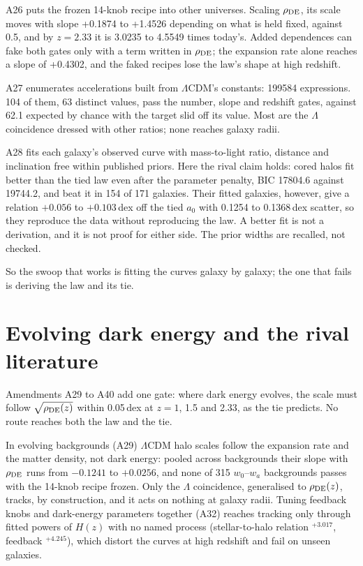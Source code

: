 \documentclass[11pt]{article}
\begin{document}
A26 puts the frozen 14-knob recipe into other universes. Scaling $\rho_{\rm DE}$, its scale moves with slope +0.1874 to +1.4526 depending on what is held fixed, against 0.5, and by $z=2.33$ it is 3.0235 to 4.5549 times today's. Added dependences can fake both gates only with a term written in $\rho_{\rm DE}$; the expansion rate alone reaches a slope of +0.4302, and the faked recipes lose the law's shape at high redshift.

A27 enumerates accelerations built from $\Lambda$CDM's constants: 199584 expressions. 104 of them, 63 distinct values, pass the number, slope and redshift gates, against 62.1 expected by chance with the target slid off its value. Most are the $\Lambda$ coincidence dressed with other ratios; none reaches galaxy radii.

A28 fits each galaxy's observed curve with mass-to-light ratio, distance and inclination free within published priors. Here the rival claim holds: cored halos fit better than the tied law even after the parameter penalty, BIC 17804.6 against 19744.2, and beat it in 154 of 171 galaxies. Their fitted galaxies, however, give a relation $+0.056$ to $+0.103$\,dex off the tied $a_0$ with 0.1254 to 0.1368\,dex scatter, so they reproduce the data without reproducing the law. A better fit is not a derivation, and it is not proof for either side. The prior widths are recalled, not checked.

So the swoop that works is fitting the curves galaxy by galaxy; the one that fails is deriving the law and its tie.

\section{Evolving dark energy and the rival literature}
Amendments A29 to A40 add one gate: where dark energy evolves, the scale must follow $\sqrt{\rho_{\rm DE}(z)}$ within 0.05\,dex at $z=1$, 1.5 and 2.33, as the tie predicts. No route reaches both the law and the tie.

In evolving backgrounds (A29) $\Lambda$CDM halo scales follow the expansion rate and the matter density, not dark energy: pooled across backgrounds their slope with $\rho_{\rm DE}$ runs from $-0.1241$ to $+0.0256$, and none of 315 $w_0$--$w_a$ backgrounds passes with the 14-knob recipe frozen. Only the $\Lambda$ coincidence, generalised to $\rho_{\rm DE}(z)$, tracks, by construction, and it acts on nothing at galaxy radii. Tuning feedback knobs and dark-energy parameters together (A32) reaches tracking only through fitted powers of $H(z)$ with no named process (stellar-to-halo relation $^{+3.017}$, feedback $^{+4.245}$), which distort the curves at high redshift and fail on unseen galaxies.
\end{document}
